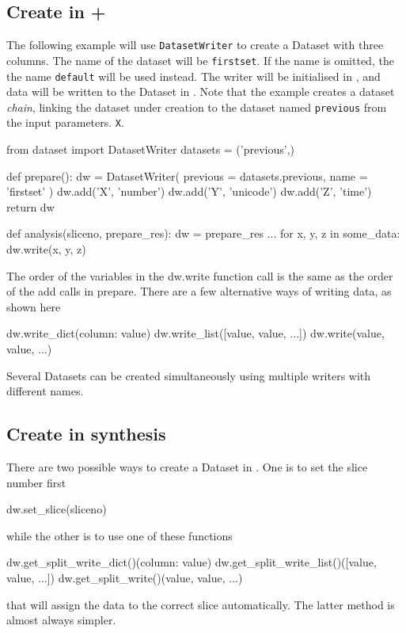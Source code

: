 \subsection{Create in \prepare + \analysis}

The following example will use \texttt{DatasetWriter} to create a
Dataset with three columns.  The name of the dataset will be
\texttt{firstset}.  If the name is omitted, the the name
\texttt{default} will be used instead.  The writer will be initialised
in \prepare, and data will be written to the Dataset in \analysis.
Note that the example creates a dataset \emph{chain}, linking the
dataset under creation to the dataset named \texttt{previous} from the
input parameters.
\texttt{X}.
\begin{python}
from dataset import DatasetWriter
datasets = ('previous',)

def prepare():
    dw = DatasetWriter(
        previous = datasets.previous,
        name = 'firstset'
    )
    dw.add('X', 'number')
    dw.add('Y', 'unicode')
    dw.add('Z', 'time')
    return dw

def analysis(sliceno, prepare_res):
    dw = prepare_res
    ...
    for x, y, z in some_data:
        dw.write(x, y, z)
\end{python}
The order of the variables in the dw.write function call is the same
as the order of the add calls in prepare.  There are a few alternative
ways of writing data, as shown here
\begin{python}
dw.write_dict({column: value})
dw.write_list([value, value, ...])
dw.write(value, value, ...)
\end{python}
Several Datasets can be created simultaneously using multiple writers
with different names.



\clearpage
\subsection{Create in synthesis}

There are two possible ways to create a Dataset in \synthesis.  One is
to set the slice number first
\begin{python}
dw.set_slice(sliceno)
\end{python}
while the other is to use one of these functions
\begin{python}
dw.get_split_write_dict()({column: value})
dw.get_split_write_list()([value, value, ...])
dw.get_split_write()(value, value, ...)
\end{python}
that will assign the data to the correct slice automatically.  The
latter method is almost always simpler.



